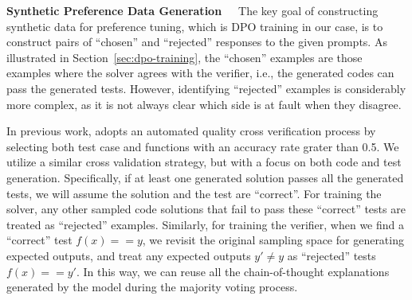 \textbf{Synthetic Preference Data Generation}\ \ \ 
The key goal of constructing synthetic data for preference tuning, which is DPO training in our case, is to construct pairs of ``chosen'' and ``rejected'' responses to the given prompts. As illustrated in Section~\ref{sec:dpo-training}, the ``chosen'' examples are those examples where the solver  agrees with the verifier, i.e., the generated codes can pass the generated tests. However, identifying ``rejected'' examples is considerably more complex, as it is not always clear which side is at fault when they disagree.

In previous work, \citet{dong2024self} adopts an automated quality cross verification process by selecting both test case and functions with an accuracy rate grater than 0.5.
We utilize a similar cross validation strategy, but with a focus on both code and test generation. Specifically, if at least one generated solution passes all the generated tests, we will assume the solution and the test are ``correct''.
For training the solver, any other sampled code solutions that fail to pass these ``correct'' tests are treated as ``rejected'' examples.
Similarly, for training the verifier, when we find a ``correct'' test $f(x) == y$, we revisit the original sampling space for generating expected outputs, and treat any expected outputs $y' \neq y$ as ``rejected'' tests $f(x) == y'$. In this way, we can reuse all the chain-of-thought explanations generated by the model  during the majority voting process.
